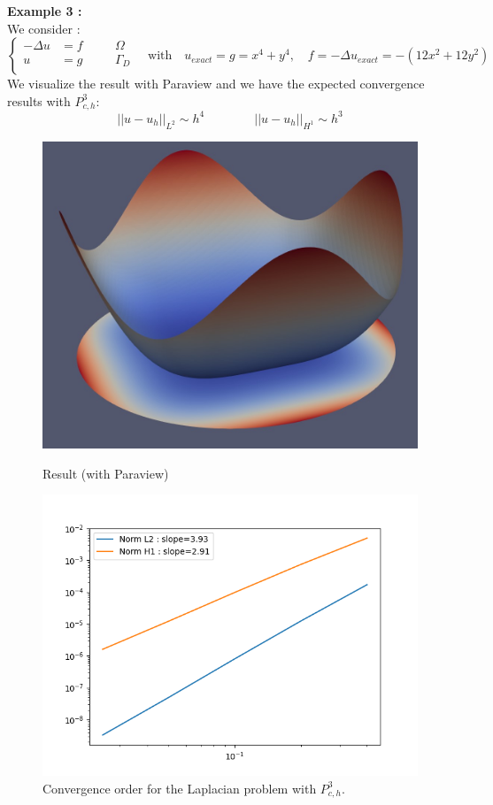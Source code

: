 \noindent\textbf{Example 3 :} \\
We consider :
$$\left\{\begin{aligned}
	-\Delta u &= f \quad&&\Omega \\
	u&=g \quad&&\Gamma_D \\
\end{aligned}\right. \quad \text{with} \quad
u_{exact}=g=x^4+y^4, \quad f=-\Delta u_{exact}=-(12x^2+12y^2)$$
\noindent We visualize the result with Paraview and we have the expected convergence results  with $P_{c,h}^3$:
$$||u-u_h||_{L^2}\sim h^4 \qquad \qquad ||u-u_h||_{H^1}\sim h^3$$
\begin{figure}[H]
	\begin{minipage}{0.48\linewidth}
		\centering
		\includegraphics[width=0.7\linewidth]{"images/parareal/feelpp/circle_result_3.jpg"}
		\caption{Result (with Paraview)}
	\end{minipage}
	\begin{minipage}{0.48\linewidth}
		\centering\includegraphics[width=0.9\linewidth]{"images/parareal/feelpp/cvg_laplacian_k3_o4.png"}
		\caption{Convergence order for the Laplacian problem with $P_{c,h}^3$.}
	\end{minipage}
\end{figure}